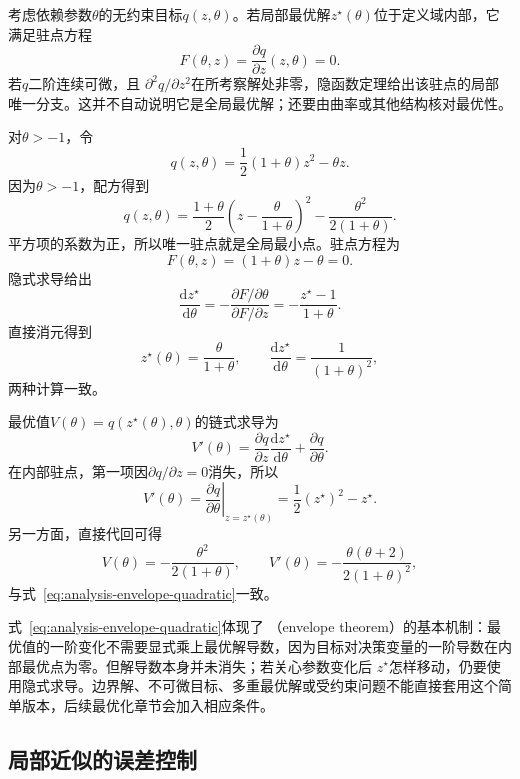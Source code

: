 考虑依赖参数$\theta$的无约束目标$q(z,\theta)$。若局部最优解$z^\star(\theta)$位于定义域内部，它满足驻点方程
\[   F(\theta,z)   =   \frac{\partial q}{\partial z}(z,\theta)   =   0. \]
若$q$二阶连续可微，且 $\partial^2q/\partial z^2$在所考察解处非零，隐函数定理给出该驻点的局部唯一分支。这并不自动说明它是全局最优解；还要由曲率或其他结构核对最优性。
\begin{example}[参数二次目标中的解导数与包络导数]
\label{ex:analysis-parametric-quadratic}
对$\theta>-1$，令
\[   q(z,\theta)   =   \frac12(1+\theta)z^2-\theta z. \]
因为$\theta>-1$，配方得到
\[
  q(z,\theta)=\frac{1+\theta}{2}
  \left(z-\frac{\theta}{1+\theta}\right)^2
  -\frac{\theta^2}{2(1+\theta)}.
\]
平方项的系数为正，所以唯一驻点就是全局最小点。驻点方程为
\[   F(\theta,z)=(1+\theta)z-\theta=0. \]
隐式求导给出
\[   \frac{\mathrm{d}z^\star}{\mathrm{d}\theta}   =   -\frac{\partial F/\partial\theta}{\partial F/\partial z}   =   -\frac{z^\star-1}{1+\theta}. \]
直接消元得到
\[   z^\star(\theta)=\frac{\theta}{1+\theta},   \qquad   \frac{\mathrm{d}z^\star}{\mathrm{d}\theta}   =   \frac{1}{(1+\theta)^2}, \]
两种计算一致。

最优值$V(\theta)=q(z^\star(\theta),\theta)$的链式求导为
\[   V'(\theta)   =   \frac{\partial q}{\partial z}   \frac{\mathrm{d}z^\star}{\mathrm{d}\theta}   +   \frac{\partial q}{\partial\theta}. \]
在内部驻点，第一项因$\partial q/\partial z=0$消失，所以
\begin{equation}
  V'(\theta)
  =
  \left.
  \frac{\partial q}{\partial\theta}
  \right|_{z=z^\star(\theta)}
  =
  \frac12(z^\star)^2-z^\star.
\label{eq:analysis-envelope-quadratic}
\end{equation}
另一方面，直接代回可得
\[   V(\theta)=-\frac{\theta^2}{2(1+\theta)},   \qquad   V'(\theta)   =   -\frac{\theta(\theta+2)}{2(1+\theta)^2}, \]
与式~\eqref{eq:analysis-envelope-quadratic}一致。
\end{example}

式~\eqref{eq:analysis-envelope-quadratic}体现了
（envelope theorem）的基本机制：最优值的一阶变化不需要显式乘上最优解导数，因为目标对决策变量的一阶导数在内部最优点为零。但解导数本身并未消失；若关心参数变化后 $z^\star$怎样移动，仍要使用隐式求导。边界解、不可微目标、多重最优解或受约束问题不能直接套用这个简单版本，后续最优化章节会加入相应条件。

\subsection{局部近似的误差控制}

